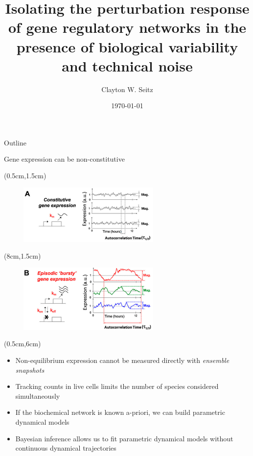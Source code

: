 \documentclass[aspectratio=1610]{beamer}					%
\title{Isolating the perturbation response of gene regulatory networks in the presence of biological variability and technical noise}	%
\author{Clayton W. Seitz}								%
\date{\today}									%
\begin{document}
\begin{frame}
  \titlepage
\end{frame}

\begin{frame}{Outline}
  \tableofcontents
\end{frame}


%

\begin{frame}{Gene expression can be non-constitutive}


\begin{textblock*}{7cm}(0.5cm,1.5cm)
\begin{figure}
\includegraphics[width=7cm]{burst-1.png}
\end{figure}
\end{textblock*}

\begin{textblock*}{7cm}(8cm,1.5cm)
\begin{figure}
\includegraphics[width=7cm]{burst-2.png}
\end{figure}
\end{textblock*}


\begin{textblock*}{15cm}(0.5cm,6cm)
\begin{itemize}
\item Non-equilibrium expression cannot be measured directly with \emph{ensemble snapshots}
\item Tracking counts in live cells limits the number of species considered simultaneously
\item If the biochemical network is known a-priori, we can build parametric dynamical models
\item Bayesian inference allows us to fit parametric dynamical models without continuous dynamical trajectories
\end{itemize}
\end{textblock*}


\end{frame}
\end{document}
